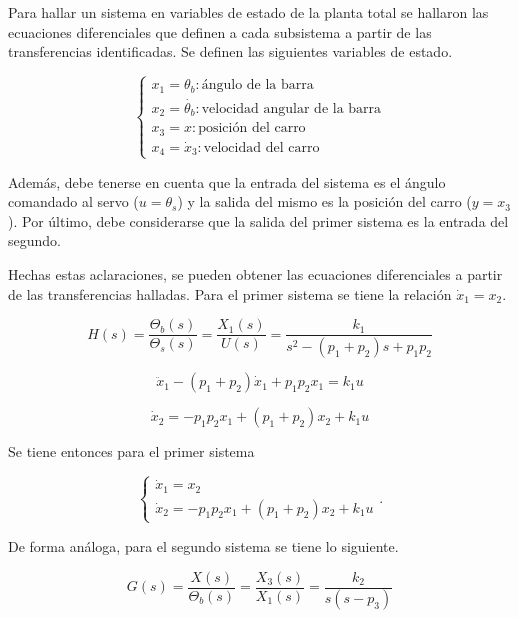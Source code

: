 \documentclass[a4paper,12pt]{article}
\begin{document}
Para hallar un sistema en variables de estado de la planta total se hallaron las ecuaciones diferenciales que definen a cada subsistema a partir de las transferencias identificadas. Se definen las siguientes variables de estado.

\[
\begin{cases}
x_1 = \theta_b : \text{ángulo de la barra} \\
x_2 = \dot{\theta_b}: \text{velocidad angular de la barra} \\
x_3 = x : \text{posición del carro} \\
x_4 = \dot{x}_3: \text{velocidad del carro}
\end{cases}
\]

Además, debe tenerse en cuenta que la entrada del sistema es el ángulo comandado al servo ($u = \theta_s$) y la salida del mismo es la posición del carro ($y = x_3$). Por último, debe considerarse que la salida del primer sistema es la entrada del segundo.

Hechas estas aclaraciones, se pueden obtener las ecuaciones diferenciales a partir de las transferencias halladas. Para el primer sistema se tiene la relación $\dot{x}_1 = x_2$.

\begin{equation*}
  H(s) = \frac{\Theta_b(s)}{\Theta_s(s)} = \frac{X_1(s)}{U(s)} = \frac{k_1}{s^2 - (p_1 + p_2)s + p_1p_2}
\end{equation*}

\begin{equation*}
  \ddot{x}_1 - (p_1 + p_2) \dot{x}_1 + p_1p_2 x_1 = k_1 u
\end{equation*}

\begin{equation*}
  \dot{x}_2 = - p_1p_2 x_1 + (p_1 + p_2) x_2 + k_1 u
\end{equation*}

Se tiene entonces para el primer sistema

\[
\begin{cases}
\dot{x}_1 = x_2 \\
\dot{x}_2 = - p_1p_2 x_1 + (p_1 + p_2) x_2 + k_1 u
\end{cases}.
\]

De forma análoga, para el segundo sistema se tiene lo siguiente.

\begin{equation*}
  G(s) = \frac{X(s)}{\Theta_b(s)} = \frac{X_3(s)}{X_1(s)} = \frac{k_2}{s (s - p_3)}
\end{equation*}
\end{document}

